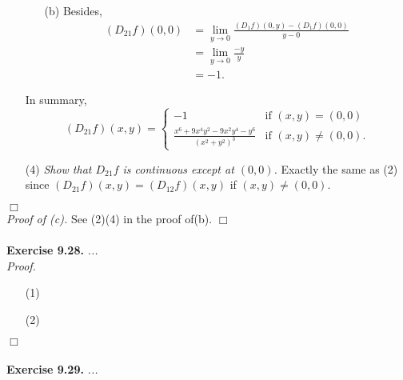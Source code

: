 \documentclass{article}
\begin{document}
\begin{enumerate}
\begin{enumerate}
  \item[(b)]
    Besides,
    \begin{align*}
      (D_{21} f)(0,0)
      &= \lim_{y \to 0} \frac{(D_1 f)(0,y) - (D_1 f)(0,0)}{y - 0} \\
      &= \lim_{y \to 0} \frac{-y}{y} \\
      &= -1.
    \end{align*}
  \end{enumerate}
  In summary,
  \begin{equation*}
    (D_{21} f)(x,y) =
    \begin{cases}
      -1
        & \text{if $(x,y) = (0,0)$} \\
      \frac{x^6+9x^4y^2-9x^2y^4-y^6}{(x^2+y^2)^3}
        & \text{if $(x,y) \neq (0,0)$}.
    \end{cases}
  \end{equation*}

\item[(4)]
  \emph{Show that $D_{21}f$ is continuous except at $(0,0)$.}
  Exactly the same as (2) since $(D_{21} f)(x,y) = (D_{12} f)(x,y)$ if $(x,y) \neq (0,0)$.

\end{enumerate}
$\Box$ \\



\emph{Proof of (c).}
  See (2)(4) in the proof of(b).
$\Box$ \\\\






\textbf{Exercise 9.28.}
\emph{...} \\

\emph{Proof.}
\begin{enumerate}
\item[(1)]
\item[(2)]

\end{enumerate}
$\Box$ \\\\






\textbf{Exercise 9.29.}
\emph{...} \\
\end{document}
